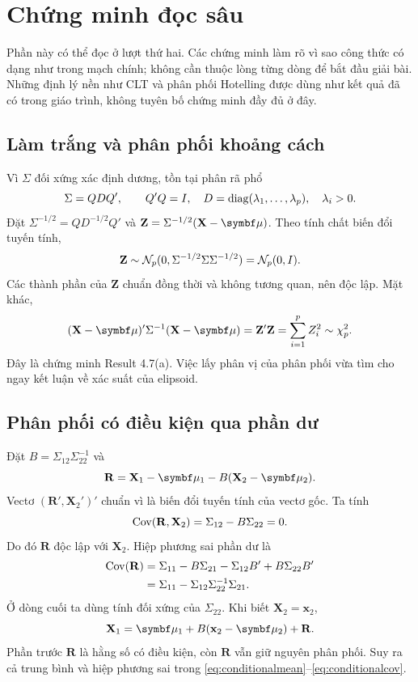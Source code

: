 \clearpage
\section{Chứng minh đọc sâu}
\label{sec:proofs}
Phần này có thể đọc ở lượt thứ hai. Các chứng minh làm rõ vì sao công
thức có dạng như trong mạch chính; không cần thuộc lòng từng dòng để bắt
đầu giải bài. Những định lý nền như CLT và phân phối Hotelling được dùng
như kết quả đã có trong giáo trình, không tuyên bố chứng minh đầy đủ ở đây.

\subsection{Làm trắng và phân phối khoảng cách}
\label{app:whitening}
Vì $\Sigma$ đối xứng xác định dương, tồn tại phân rã phổ
\[
 \Sigma=QDQ',\qquad Q'Q=I,
 \quad D=\operatorname{diag}(\lambda_1,\ldots,\lambda_p),\quad\lambda_i>0.
\]
Đặt $\Sigma^{-1/2}=QD^{-1/2}Q'$ và
$\mathbf Z=\Sigma^{-1/2}(\mathbf X-\vmu)$.
Theo tính chất biến đổi tuyến tính,
\[
 \mathbf Z\sim\mathcal N_p(0,\Sigma^{-1/2}\Sigma\Sigma^{-1/2})=\mathcal N_p(0,I).
\]
Các thành phần của $\mathbf Z$ chuẩn đồng thời và không tương quan, nên
độc lập. Mặt khác,
\[
 (\mathbf X-\vmu)'\Sigma^{-1}(\mathbf X-\vmu)
 =\mathbf Z'\mathbf Z=\sum_{i=1}^p Z_i^2\sim\chi^2_p.
\]
Đây là chứng minh Result 4.7(a). Việc lấy phân vị của phân phối vừa tìm
cho ngay kết luận về xác suất của elipsoid.

\subsection{Phân phối có điều kiện qua phần dư}
Đặt $B=\Sigma_{12}\Sigma_{22}^{-1}$ và
\[
 \mathbf R=\mathbf X_1-\vmu_1-B(\mathbf X_2-\vmu_2).
\]
Vectơ $(\mathbf R',\mathbf X_2')'$ chuẩn vì là biến đổi tuyến tính của
vectơ gốc. Ta tính
\[
 \operatorname{Cov}(\mathbf R,\mathbf X_2)=\Sigma_{12}-B\Sigma_{22}=0.
\]
Do đó $\mathbf R$ độc lập với $\mathbf X_2$.
Hiệp phương sai phần dư là
\begin{align*}
 \operatorname{Cov}(\mathbf R)
 &=\Sigma_{11}-B\Sigma_{21}-\Sigma_{12}B'+B\Sigma_{22}B'\\
 &=\Sigma_{11}-\Sigma_{12}\Sigma_{22}^{-1}\Sigma_{21}.
\end{align*}
Ở dòng cuối ta dùng tính đối xứng của $\Sigma_{22}$.
Khi biết $\mathbf X_2=\mathbf x_2$,
\[
 \mathbf X_1=\vmu_1+B(\mathbf x_2-\vmu_2)+\mathbf R.
\]
Phần trước $\mathbf R$ là hằng số có điều kiện, còn $\mathbf R$ vẫn giữ
nguyên phân phối. Suy ra cả trung bình và hiệp phương sai trong
\eqref{eq:conditionalmean}--\eqref{eq:conditionalcov}.

